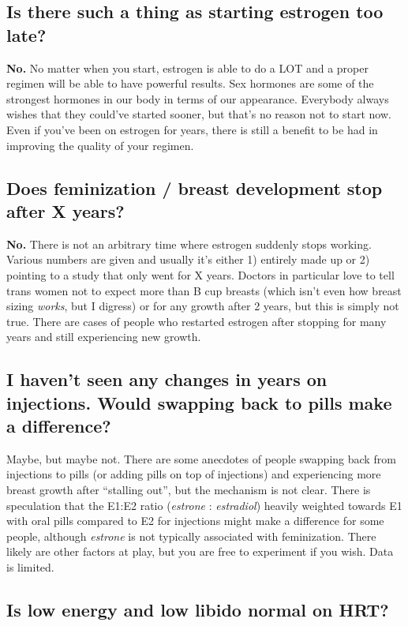 \documentclass{article}
\begin{document}
\subsection{Is there such a thing as starting estrogen too late?}

\textbf{No.} No matter when you start, estrogen is able to do a LOT and a proper regimen will be able to have powerful results. Sex hormones are some of the strongest hormones in our body in terms of our appearance. Everybody always wishes that they could’ve started sooner, but that’s no reason not to start now. Even if you’ve been on estrogen for years, there is still a benefit to be had in improving the quality of your regimen.

\subsection{Does feminization / breast development stop after X years?}

\textbf{No.} There is not an arbitrary time where estrogen suddenly stops working. Various numbers are given and usually it’s either 1) entirely made up or 2) pointing to a study that only went for X years. Doctors in particular love to tell trans women not to expect more than B cup breasts (which isn’t even how breast sizing \textit{works}, but I digress) or for any growth after 2 years, but this is simply not true. There are cases of people who restarted estrogen after stopping for many years and still experiencing new growth.

\subsection{I haven’t seen any changes in years on injections. Would swapping back to pills make a difference?}

Maybe, but maybe not. There are some anecdotes of people swapping back from injections to pills (or adding pills on top of injections) and experiencing more breast growth after “stalling out”, but the mechanism is not clear. There is speculation that the E1:E2 ratio (\textit{estrone} : \textit{estradiol}) heavily weighted towards E1 with oral pills compared to E2 for injections might make a difference for some people, although \textit{estrone} is not typically associated with feminization. There likely are other factors at play, but you are free to experiment if you wish. Data is limited.

\subsection{Is low energy and low libido normal on HRT?}
\end{document}
